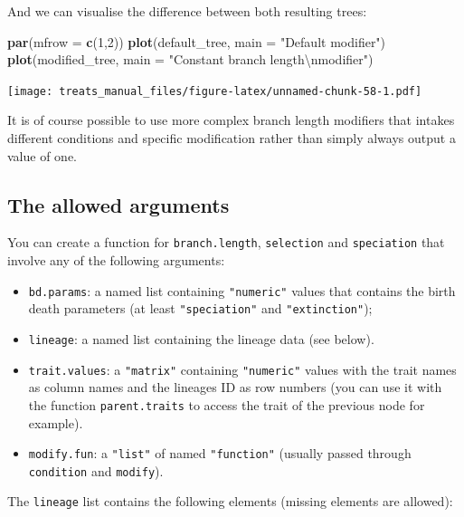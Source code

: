 \documentclass[
]{book}
\newenvironment{Shaded}{\begin{snugshade}}{\end{snugshade}}
\newcommand{\CharTok}[1]{\textcolor[rgb]{0.31,0.60,0.02}{#1}}
\newcommand{\DataTypeTok}[1]{\textcolor[rgb]{0.13,0.29,0.53}{#1}}
\newcommand{\DecValTok}[1]{\textcolor[rgb]{0.00,0.00,0.81}{#1}}
\newcommand{\KeywordTok}[1]{\textcolor[rgb]{0.13,0.29,0.53}{\textbf{#1}}}
\newcommand{\NormalTok}[1]{#1}
\newcommand{\StringTok}[1]{\textcolor[rgb]{0.31,0.60,0.02}{#1}}
\providecommand{\tightlist}{%
  \setlength{\itemsep}{0pt}\setlength{\parskip}{0pt}}
\begin{document}
And we can visualise the difference between both resulting trees:

\begin{Shaded}
\begin{Highlighting}[]
\KeywordTok{par}\NormalTok{(}\DataTypeTok{mfrow =} \KeywordTok{c}\NormalTok{(}\DecValTok{1}\NormalTok{,}\DecValTok{2}\NormalTok{))}
\KeywordTok{plot}\NormalTok{(default\_tree,  }\DataTypeTok{main =} \StringTok{"Default modifier"}\NormalTok{)}
\KeywordTok{plot}\NormalTok{(modified\_tree, }\DataTypeTok{main =} \StringTok{"Constant branch length}\CharTok{\textbackslash{}n}\StringTok{modifier"}\NormalTok{)}
\end{Highlighting}
\end{Shaded}

\texttt{[image: treats\_manual\_files/figure-latex/unnamed-chunk-58-1.pdf]}

It is of course possible to use more complex branch length modifiers that intakes different conditions and specific modification rather than simply always output a value of one.

\hypertarget{allowarguments}{%
\subsection{The allowed arguments}\label{allowarguments}}

You can create a function for \texttt{branch.length}, \texttt{selection} and \texttt{speciation} that involve any of the following arguments:

\begin{itemize}
\tightlist
\item
  \texttt{bd.params}: a named list containing \texttt{"numeric"} values that contains the birth death parameters (at least \texttt{"speciation"} and \texttt{"extinction"});
\item
  \texttt{lineage}: a named list containing the lineage data (see below).
\item
  \texttt{trait.values}: a \texttt{"matrix"} containing \texttt{"numeric"} values with the trait names as column names and the lineages ID as row numbers (you can use it with the function \texttt{parent.traits} to access the trait of the previous node for example).
\item
  \texttt{modify.fun}: a \texttt{"list"} of named \texttt{"function"} (usually passed through \texttt{condition} and \texttt{modify}).
\end{itemize}

The \texttt{lineage} list contains the following elements (missing elements are allowed):
\end{document}
